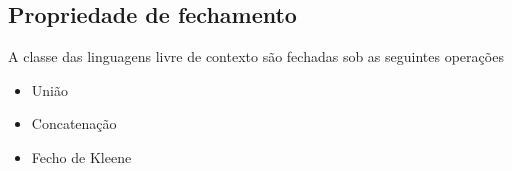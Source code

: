 \documentclass[11pt]{article}
\begin{document}
\subsection{Propriedade de fechamento}
\label{sec:orgb6300c4}
A classe das linguagens livre de contexto são fechadas sob as seguintes operações
\begin{itemize}[itemsep=0pt]
\item União
\item Concatenação
\item Fecho de Kleene
\end{itemize}
\end{document}
